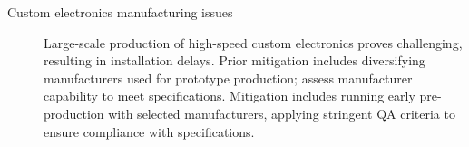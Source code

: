 \begin{description}
\item[Custom electronics manufacturing issues] Large-scale production of high-speed custom
  electronics proves challenging, resulting in  installation delays. Prior mitigation includes diversifying manufacturers used for prototype production; assess manufacturer capability to meet specifications.  Mitigation includes running early pre-production with selected manufacturers, applying stringent QA criteria to ensure compliance with specifications.

\end{description}
